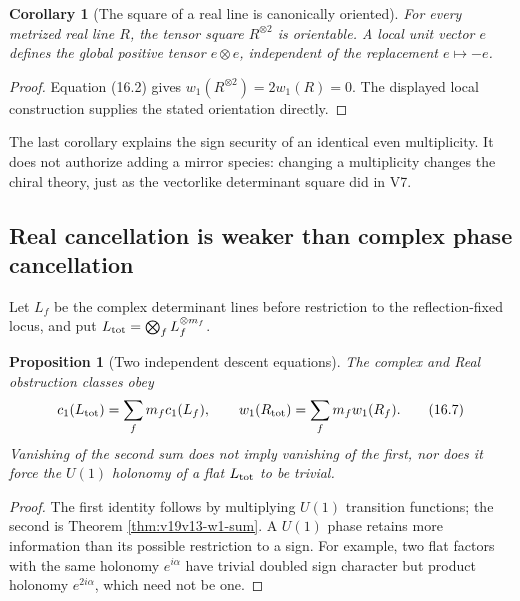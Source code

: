 \documentclass[11pt]{article}
\newtheorem{proposition}[theorem]{Proposition}
\newtheorem{corollary}[theorem]{Corollary}
\theoremstyle{remark}
\begin{document}
\begin{corollary}[The square of a real line is canonically oriented]
\label{cor:v19v13-square}
For every metrized real line \(R\), the tensor square \(R^{\otimes2}\) is
orientable.  A local unit vector \(e\) defines the global positive tensor
\(e\otimes e\), independent of the replacement \(e\mapsto-e\).
\end{corollary}

\begin{proof}
Equation (16.2) gives \(w_1(R^{\otimes2})=2w_1(R)=0\).
The displayed local construction supplies the stated orientation directly.
\end{proof}

The last corollary explains the sign security of an identical even
multiplicity.  It does not authorize adding a mirror species: changing a
multiplicity changes the chiral theory, just as the vectorlike determinant
square did in V7.

\subsection{Real cancellation is weaker than complex phase cancellation}

Let \(L_f\) be the complex determinant lines before restriction to the
reflection-fixed locus, and put \(L_{\rm tot}=\bigotimes_fL_f^{\otimes
m_f}\).

\begin{proposition}[Two independent descent equations]
\label{prop:v19v13-two-obstructions}
The complex and Real obstruction classes obey
\[
 c_1(L_{\rm tot})=\sum_fm_fc_1(L_f),\qquad
 w_1(R_{\rm tot})=\sum_fm_fw_1(R_f).                           \tag{16.7}
\]
Vanishing of the second sum does not imply vanishing of the first, nor
does it force the \(U(1)\) holonomy of a flat \(L_{\rm tot}\) to be
trivial.
\end{proposition}

\begin{proof}
The first identity follows by multiplying \(U(1)\) transition functions;
the second is Theorem \ref{thm:v19v13-w1-sum}.  A \(U(1)\) phase retains
more information than its possible restriction to a sign.  For example,
two flat factors with the same holonomy \(e^{i\alpha}\) have trivial
doubled sign character but product holonomy \(e^{2i\alpha}\), which need
not be one.
\end{proof}
\end{document}
